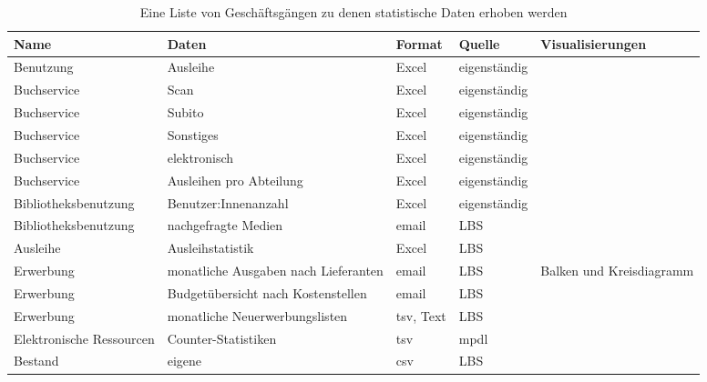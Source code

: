 \begingroup
\setlength{\tabcolsep}{12pt} %
\renewcommand{\arraystretch}{1.5} 
\begin{table}[h]
    \centering
    \begin{adjustbox}{max width=\textwidth}
    \begin{tabular}{lllll}
       \toprule
       \textbf{Name}& \textbf{Daten} & \textbf{Format} & \textbf{Quelle} & \textbf{Visualisierungen}\\
       \midrule     
            Benutzung                & Ausleihe                            & Excel         & eigenständig & \- \\ 
            Buchservice              & Scan                                 & Excel         & eigenständig & \-\\ 
            Buchservice              & Subito                               & Excel         & eigenständig & \-\\ 
            Buchservice              & Sonstiges                            & Excel         & eigenständig & \-\\ 
            Buchservice              & elektronisch                         & Excel         & eigenständig & \-\\ 
            Buchservice              & Ausleihen pro Abteilung              & Excel         & eigenständig & \-\\ 
            Bibliotheksbenutzung     & Benutzer:Innenanzahl                 & Excel         & eigenständig & \-\\ 
            Bibliotheksbenutzung     & nachgefragte Medien                  & email         & LBS          & \-\\ 
            Ausleihe                 & Ausleihstatistik                     & Excel         & LBS          & \-\\ 
            Erwerbung                & monatliche Ausgaben nach Lieferanten & email         & LBS          & Balken und Kreisdiagramm\\ 
            Erwerbung                & Budgetübersicht nach Kostenstellen   & email         & LBS          & \-\\ 
            Erwerbung                & monatliche Neuerwerbungslisten       & tsv, Text     & LBS          & \-\\ 
            Elektronische Ressourcen & Counter-Statistiken                  & tsv           & mpdl         & \-\\ 
            Bestand                  & eigene                               & csv           & LBS          & \-\\
        \bottomrule
    \end{tabular}
    \end{adjustbox}
    \caption{%
        Eine Liste von Geschäftsgängen zu denen statistische Daten erhoben werden
    }
    \label{tab:Statistische_Daten}
     \end{table}
\endgroup

